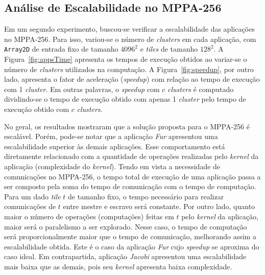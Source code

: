 \documentclass[12pt]{article}
\newcommand{\mppa}{MPPA-256\xspace}
\begin{document}
\subsection{Análise de Escalabilidade no \mppa}

Em um segundo experimento, buscou-se verificar a escalabilidade das aplicações
no \mppa. Para isso, variou-se o número de \textit{clusters} em cada aplicação,
com \texttt{Array2D} de entrada fixo de tamanho $4096^2$ e \textit{tiles} de
tamanho $128^2$. A Figura~\ref{fig:appsTime} apresenta os tempos de execução
obtidos ao variar-se o número de \textit{clusters} utilizados na computação. A
Figura~\ref{fig:speedup}, por outro lado, apresenta o fator de aceleração
(\textit{speedup}) com relação ao tempo de execução com 1 \textit{cluster}. Em
outras palavras, o \textit{speedup} com $c$ \textit{clusters} é computado
dividindo-se o tempo de execução obtido com apenas 1 \textit{cluster} pelo tempo
de execução obtido com $c$ \textit{clusters}.

No geral, os resultados mostraram que a solução proposta para o \mppa é
escalável. Porém, pode-se notar que a aplicação \textit{Fur} apresentou uma
escalabilidade superior às demais aplicações. Esse comportamento está
diretamente relacionado com a quantidade de operações realizadas pelo
\textit{kernel} da aplicação (complexidade do \textit{kernel}). Tendo em vista a
necessidade de comunicações no \mppa, o tempo total de execução de uma aplicação
passa a ser composto pela soma do tempo de comunicação com o tempo de
computação. Para um dado \textit{tile} $t$ de tamanho fixo, o tempo necessário
para realizar comunicações de $t$ entre mestre e escravo será constante. Por
outro lado, quanto maior o número de operações (computações) feitas em $t$ pelo
\textit{kernel} da aplicação, maior será o paralelismo a ser explorado. Nesse
caso, o tempo de computação será proporcionalmente maior que o tempo de
comunicação, melhorando assim a escalabilidade obtida. Este é o caso da
aplicação \textit{Fur} cujo \textit{speedup} se aproxima do caso ideal. Em
contrapartida, aplicação \textit{Jacobi} apresentou uma escalabilidade mais
baixa que as demais, pois seu \textit{kernel} apresenta baixa complexidade.
\end{document}
